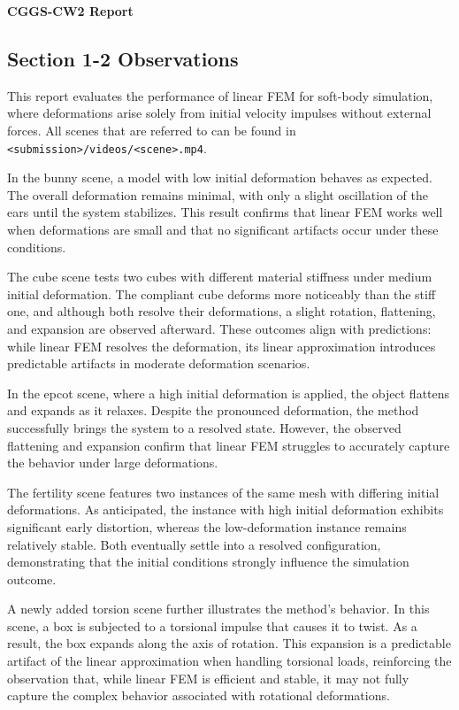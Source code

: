 \documentclass[11pt,a4paper]{article}
\begin{document}
 

{\Large \textbf{CGGS-CW2 Report}}\\
\indent {}

\subsection*{Section 1-2 Observations}

This report evaluates the performance of linear FEM for soft-body simulation, where deformations arise solely from initial velocity impulses without external forces. 
All scenes that are referred to can be found in \texttt{<submission>/videos/<scene>.mp4}.

In the bunny scene, a model with low initial deformation behaves as expected. The overall deformation remains minimal, with only a slight oscillation of the ears until the system stabilizes. This result confirms that linear FEM works well when deformations are small and that no significant artifacts occur under these conditions.

The cube scene tests two cubes with different material stiffness under medium initial deformation. The compliant cube deforms more noticeably than the stiff one, and although both resolve their deformations, a slight rotation, flattening, and expansion are observed afterward. These outcomes align with predictions: while linear FEM resolves the deformation, its linear approximation introduces predictable artifacts in moderate deformation scenarios.

In the epcot scene, where a high initial deformation is applied, the object flattens and expands as it relaxes. Despite the pronounced deformation, the method successfully brings the system to a resolved state. However, the observed flattening and expansion confirm that linear FEM struggles to accurately capture the behavior under large deformations.

The fertility scene features two instances of the same mesh with differing initial deformations. As anticipated, the instance with high initial deformation exhibits significant early distortion, whereas the low-deformation instance remains relatively stable. Both eventually settle into a resolved configuration, demonstrating that the initial conditions strongly influence the simulation outcome.

A newly added torsion scene further illustrates the method’s behavior. In this scene, a box is subjected to a torsional impulse that causes it to twist. As a result, the box expands along the axis of rotation. This expansion is a predictable artifact of the linear approximation when handling torsional loads, reinforcing the observation that, while linear FEM is efficient and stable, it may not fully capture the complex behavior associated with rotational deformations.
\end{document}

